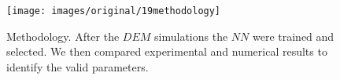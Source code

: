 \begin{figure}[!htb] 
\centering 
\texttt{[image: images/original/19methodology]} 
\caption[Methodology]{Methodology. After the $DEM$ simulations the $NN$ were
trained and selected. We then compared experimental and numerical results to
identify the valid parameters.}
\label{fig:19methodology} 
\end{figure}


